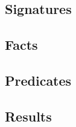 \subsection{Signatures}
\label{sect:alloy:signatures}


\subsection{Facts}
\label{sect:alloy:facts}


\subsection{Predicates}
\label{sect:alloy:predicates}


\subsection{Results}
\label{sect:alloy:results}

